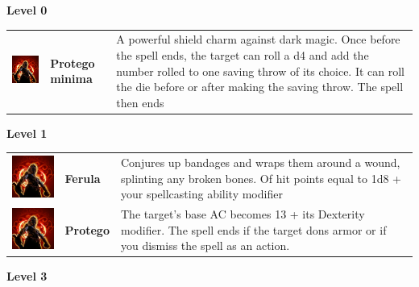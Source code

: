 \textbf{Level 0} 
\begin{tabular}{ m{4cm}m{3cm}m{6cm} } 
	\includegraphics[width=4cm]{../Pictures/Gameplay/Spells/Icon/spell_icon.png} & \textbf{Protego minima} & A powerful shield charm against dark magic. Once before the spell ends, the target can roll a d4 and add the number rolled to one saving throw of its choice. It can roll the die before or after making the saving throw. The spell then ends \\ 
\end{tabular}
\textbf{Level 1} 
\begin{tabular}{ m{4cm}m{3cm}m{6cm} } 
	\includegraphics[width=4cm]{../Pictures/Gameplay/Spells/Icon/spell_icon.png} & \textbf{Ferula} & Conjures up bandages and wraps them around a wound, splinting any broken bones. Of hit points equal to 1d8 + your spellcasting ability modifier\\ 
   \includegraphics[width=4cm]{../Pictures/Gameplay/Spells/Icon/spell_icon.png} & \textbf{Protego} &  The target's base AC becomes 13 + its Dexterity modifier. The spell ends if the target dons armor or if you dismiss the spell as an action. \\ 
\end{tabular}
\textbf{Level 3} 
